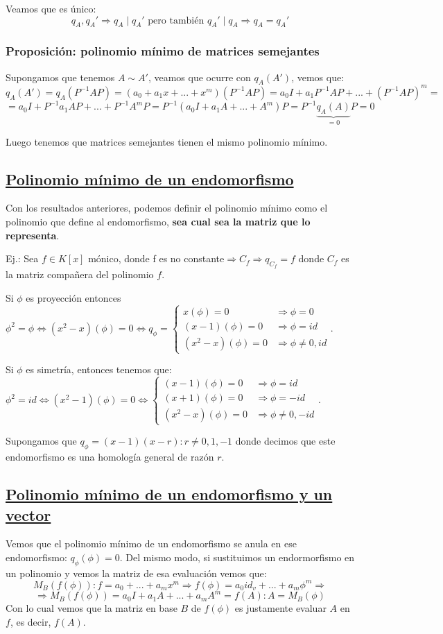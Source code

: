 \documentclass[10pt,a4paper,openright]{book}
\begin{document}
Veamos que es único:
$$q_A, q_A'\Rightarrow q_A\mid q_A' \mbox{ pero también }q_A'\mid q_A \Rightarrow q_A = q_A'$$

\subsubsection*{Proposición: polinomio mínimo de matrices semejantes}
Supongamos que tenemos $A\sim A'$, veamos que ocurre con $q_A(A')$, vemos que:
$$q_A(A')=q_A(P^{-1}AP)= (a_0+a_1x+...+x^m)(P^{-1}AP)= a_0I+a_1P^{-1}AP+...+(P^{-1}AP)^m= $$
$$= a_0I+P^{-1}a_1AP+...+ P^{-1}A^mP= P^{-1}(a_0I+a_1A+...+A^m)P = P^{-1}\underbrace{q_A(A)}_{=0}P = 0$$

Luego tenemos que matrices semejantes tienen el mismo polinomio mínimo.

\subsection*{\underline{Polinomio mínimo de un endomorfismo}}
Con los resultados anteriores, podemos definir el polinomio mínimo como el polinomio que define al endomorfismo, \textbf{sea cual sea la matriz que lo representa}.

Ej.:
Sea $f\in K[x]$ mónico, donde f es no constante$\Rightarrow C_f\Rightarrow q_{C_f}=f$ donde $C_f$ es la matriz compañera del polinomio $f$.

Si $\phi$ es proyección entonces $\phi^2= \phi\Leftrightarrow (x^2-x)(\phi)= 0\Leftrightarrow q_\phi = \begin{cases} x(\phi) = 0 & \Rightarrow \phi = 0 \\ (x-1)(\phi) = 0 & \Rightarrow\phi = id \\ (x^2-x)(\phi) = 0 & \Rightarrow\phi \neq 0,id\end{cases}$.

Si $\phi$ es simetría, entonces tenemos que: $\phi^2=id\Leftrightarrow (x^2-1)(\phi)=0\Leftrightarrow \begin{cases} (x-1)(\phi) = 0 & \Rightarrow \phi = id \\ (x+1)(\phi) = 0 & \Rightarrow \phi = -id \\ (x^2-x)(\phi) = 0 & \Rightarrow\phi \neq 0,-id\end{cases}$.

Supongamos que $q_\phi = (x-1)(x-r): r\neq 0, 1, -1$ donde decimos que este endomorfismo es una homología general de razón $r$.

\subsection*{\underline{Polinomio mínimo de un endomorfismo y un vector}}
Vemos que el polinomio mínimo de un endomorfismo se anula en ese endomorfismo: $q_\phi(\phi)=0$. Del mismo modo, si sustituimos un endormorfismo en un polinomio y vemos la matriz de esa evaluación vemos que:
$$M_B(f(\phi)): f= a_0+...+a_mx^m \Rightarrow f(\phi)= a_0 id_v+...+a_m\phi^m\Rightarrow$$
$$\Rightarrow M_B(f(\phi))=a_0I+a_1A+...+a_mA^m= f(A):A=M_B(\phi)$$
Con lo cual vemos que la matriz en base $B$ de $f(\phi)$ es justamente evaluar $A$ en $f$, es decir, $f(A)$.
\end{document}
